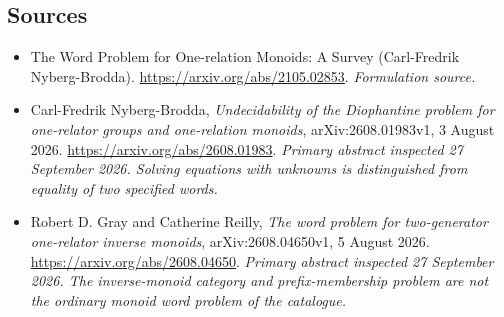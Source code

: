 \documentclass[11pt]{article}
\begin{document}
\subsection{Sources}
\begin{itemize}
\item[S1]The Word Problem for One-relation Monoids: A Survey (Carl-Fredrik Nyberg-Brodda).
\url{https://arxiv.org/abs/2105.02853}.
\textit{Formulation source.}
\item[E1]Carl-Fredrik Nyberg-Brodda, \emph{Undecidability of the
Diophantine problem for one-relator groups and one-relation monoids},
arXiv:2608.01983v1, 3 August 2026.
\url{https://arxiv.org/abs/2608.01983}.
\textit{Primary abstract inspected 27 September 2026. Solving equations
with unknowns is distinguished from equality of two specified words.}
\item[E2]Robert D. Gray and Catherine Reilly, \emph{The word problem
for two-generator one-relator inverse monoids}, arXiv:2608.04650v1,
5 August 2026.
\url{https://arxiv.org/abs/2608.04650}.
\textit{Primary abstract inspected 27 September 2026. The inverse-monoid
category and prefix-membership problem are not the ordinary monoid
word problem of the catalogue.}
\end{itemize}
\end{document}
